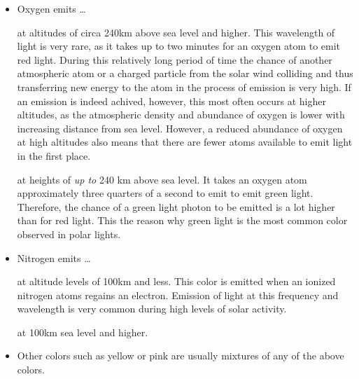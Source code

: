 \begin{itemize}
	\item Oxygen emits \dots

		\begin{itemize}

			 at altitudes of circa 240km above sea level and higher. This wavelength of light is very rare, as it takes up to two minutes for an oxygen atom to emit red light. During this relatively long period of time the chance of another atmospheric atom or a charged particle from the solar wind colliding and thus transferring new energy to the atom in the process of emission is very high. If an emission is indeed achived, however, this most often occurs at higher altitudes, as the atmospheric density and abundance of oxygen is lower with increasing distance from sea level. However, a reduced abundance of oxygen at high altitudes also means that there are fewer atoms available to emit light in the first place.

			 at heights of \emph{up to} 240 km above sea level. It takes an oxygen atom approximately three quarters of a second to emit to emit green light. Therefore, the chance of a green light photon to be emitted is a lot higher than for red light. This the reason why green light is the most common color observed in polar lights.

		\end{itemize}

	\item Nitrogen emits \dots

		\begin{itemize}

			 at altitude levels of 100km and less. This color is emitted when an ionized nitrogen atoms regains an electron. Emission of light at this frequency and wavelength is very common during high levels of solar activity.

			 at 100km sea level and higher. 

		\end{itemize}

	\item Other colors such as yellow or pink are usually mixtures of any of the above colors.

\end{itemize}

